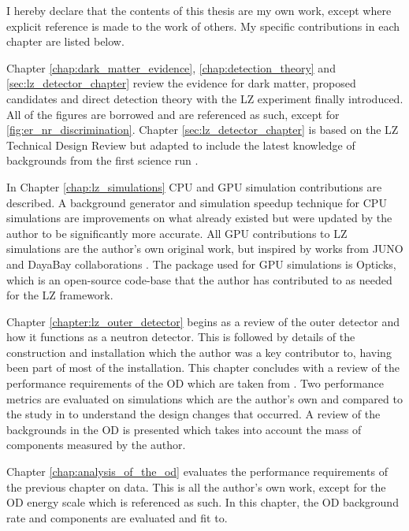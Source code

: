 \begin{SingleSpace}
I hereby declare that the contents of this thesis are my own work, except where explicit reference is made to the work of others.
My specific contributions in each chapter are listed below.
\vspace{1cm}
\par
Chapter \ref{chap:dark_matter_evidence}, \ref{chap:detection_theory} and \ref{sec:lz_detector_chapter} review the evidence for dark matter, proposed candidates and direct detection theory with the LZ experiment finally introduced.
All of the figures are borrowed and are referenced as such, except for \autoref{fig:er_nr_discrimination}.
Chapter \ref{sec:lz_detector_chapter} is based on the LZ Technical Design Review \cite{LZ_TechnicalDesignReview_ref} but adapted to include the latest knowledge of backgrounds from the first science run \cite{lz_sr1_backgrounds_ref}.
\par
In Chapter \ref{chap:lz_simulations} CPU and GPU simulation contributions are described.
A background generator and simulation speedup technique for CPU simulations are improvements on what already existed but were updated by the author to be significantly more accurate.
All GPU contributions to LZ simulations are the author's own original work, but inspired by works from JUNO and DayaBay collaborations \cite{Opticks_CHEP_2019_ref}.
The package used for GPU simulations is Opticks, which is an open-source code-base that the author has contributed to as needed for the LZ framework.
\par
Chapter \ref{chapter:lz_outer_detector} begins as a review of the outer detector and how it functions as a neutron detector.
This is followed by details of the construction and installation which the author was a key contributor to, having been part of most of the installation.
This chapter concludes with a review of the performance requirements of the OD which are taken from \cite{LZ_TechnicalDesignReview_ref}.
Two performance metrics are evaluated on simulations which are the author's own and compared to the study in \cite{LZ_TechnicalDesignReview_ref} to understand the design changes that occurred.
A review of the backgrounds in the OD is presented which takes into account the mass of components measured by the author.
\par
Chapter \ref{chap:analysis_of_the_od} evaluates the performance requirements of the previous chapter on data.
This is all the author's own work, except for the OD energy scale which is referenced as such.
In this chapter, the OD background rate and components are evaluated and fit to.

\end{SingleSpace}
